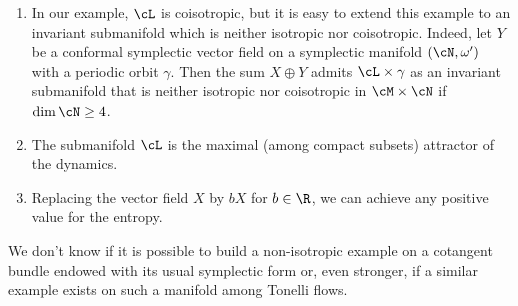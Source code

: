 \skpt
\begin{remarks}
\begin{enumerate}
\item In our example, ${\cL}$ is coisotropic, but it is easy to extend this example to an invariant submanifold which is neither isotropic nor coisotropic. Indeed, let $Y$ be a conformal
symplectic vector field on a symplectic manifold $(\cN, \omega')$ with a periodic orbit $\gamma$. Then the sum $X\oplus Y$ admits ${\cL}\times \gamma$ as an invariant submanifold that is neither isotropic nor coisotropic in $\cM\times\cN$ if $\dim\cN\geq 4$.

\item The submanifold ${\cL}$ is the maximal (among compact subsets)
attractor of the dynamics.

\item Replacing the vector field $X$ by $bX$ for $b\in\R$, we can achieve any positive value for the entropy.
\end{enumerate}
\end{remarks}
\begin{questions*}
We don't know if it is possible to build a non-isotropic example on a cotangent bundle endowed with its usual symplectic form or, even stronger, if a similar example exists on such a manifold among Tonelli flows.
\end{questions*}
